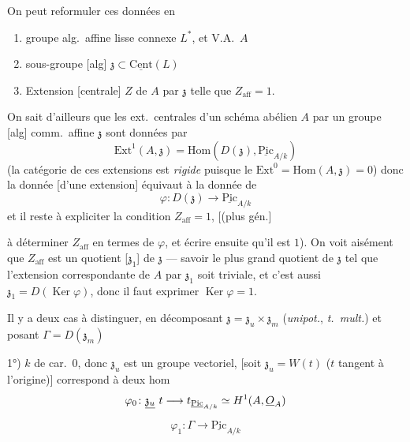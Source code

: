 \documentclass[11pt,a4paper]{article}
\begin{document}
On peut reformuler ces données en
\begin{enumerate}
  \item[a')] groupe alg.\ affine lisse connexe $L^{*}$, et V.A.\ $A$
  \item[b')] sous-groupe [alg] $\mathfrak{z} \subset \underline{\mathrm{Cent}}(L)$
  \item[c')] Extension [centrale] \struck{\ill{}} $Z$ de $A$ par $\mathfrak{z}$ telle que $Z_{\mathrm{aff}} = 1$.
\end{enumerate}

On sait d'ailleurs que les ext.\ centrales d'un schéma abélien $A$ par un groupe [alg] comm.\ affine $\mathfrak{z}$ sont données par
\[
  \mathrm{Ext}^{1}(A, \mathfrak{z}) = \mathrm{Hom}(D(\mathfrak{z}), \underline{\mathrm{Pic}}_{A/k})
\]
(la catégorie de ces extensions est \emph{rigide} puisque le $\mathrm{Ext}^{0} = \mathrm{Hom}(A, \mathfrak{z}) = 0$) donc la donnée  [d'une extension]  équivaut à la donnée de
\[
  \varphi \colon D(\mathfrak{z}) \longrightarrow \underline{\mathrm{Pic}}_{A/k}
\]
et il reste à expliciter la condition $Z_{\mathrm{aff}} = 1$, [(plus gén.] \struck{\ill{}}

à déterminer $Z_{\mathrm{aff}}$ en termes de $\varphi$, et écrire ensuite qu'il est $1$).
On voit  aisément que $Z_{\mathrm{aff}}$ est un quotient [$\mathfrak{z}_{1}$]  de $\mathfrak{z}$ --- savoir le plus grand quotient de $\mathfrak{z}$ tel que l'extension correspondante de $A$ par $\mathfrak{z}_{1}$ soit triviale, et c'est aussi $\mathfrak{z}_{1} = D(\operatorname{Ker}\varphi)$, donc il faut exprimer $\operatorname{Ker}\varphi = 1$.

\struck{\ill{}} Il y a deux cas à distinguer, en décomposant $\mathfrak{z} = \mathfrak{z}_{u} \times \mathfrak{z}_{m}$ (\emph{unipot.}, \emph{t.\ mult.}) et posant $\Gamma = D(\mathfrak{z}_{m})$

1°) $k$ de car.\ $0$, donc $\mathfrak{z}_{u}$ est un groupe vectoriel, [soit $\mathfrak{z}_{u} = W(t)$ ($t$ tangent à l'origine)]  correspond à deux hom
\[
  \varphi_{0} \colon \struck{\mathfrak{z}_{u}} \ t \longrightarrow t_{\underline{\mathrm{Pic}}_{A/k}} \simeq H^{1}(A, \underline{O}_{A})
\]
\[
  \varphi_{1} \colon \Gamma \longrightarrow \underline{\mathrm{Pic}}_{A/k}
\]
\end{document}
